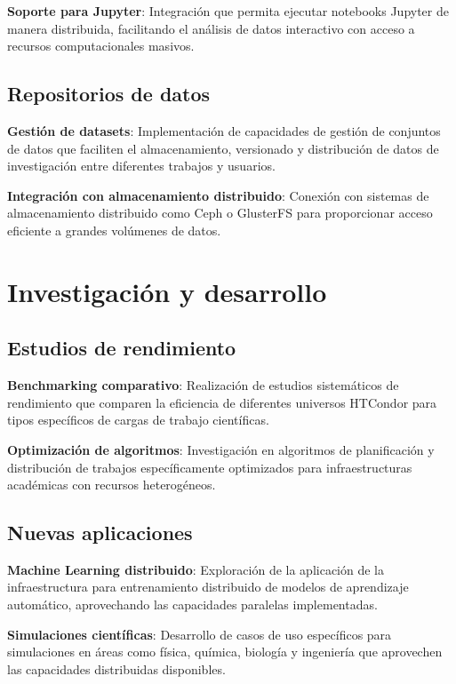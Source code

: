 \textbf{Soporte para Jupyter}: Integración que permita ejecutar notebooks Jupyter de manera distribuida, facilitando el análisis de datos interactivo con acceso a recursos computacionales masivos.

\subsection{Repositorios de datos}
\noindent

\textbf{Gestión de datasets}: Implementación de capacidades de gestión de conjuntos de datos que faciliten el almacenamiento, versionado y distribución de datos de investigación entre diferentes trabajos y usuarios.

\textbf{Integración con almacenamiento distribuido}: Conexión con sistemas de almacenamiento distribuido como Ceph o GlusterFS para proporcionar acceso eficiente a grandes volúmenes de datos.

\section{Investigación y desarrollo}
\noindent

\subsection{Estudios de rendimiento}
\noindent

\textbf{Benchmarking comparativo}: Realización de estudios sistemáticos de rendimiento que comparen la eficiencia de diferentes universos HTCondor para tipos específicos de cargas de trabajo científicas.

\textbf{Optimización de algoritmos}: Investigación en algoritmos de planificación y distribución de trabajos específicamente optimizados para infraestructuras académicas con recursos heterogéneos.

\subsection{Nuevas aplicaciones}
\noindent

\textbf{Machine Learning distribuido}: Exploración de la aplicación de la infraestructura para entrenamiento distribuido de modelos de aprendizaje automático, aprovechando las capacidades paralelas implementadas.

\textbf{Simulaciones científicas}: Desarrollo de casos de uso específicos para simulaciones en áreas como física, química, biología y ingeniería que aprovechen las capacidades distribuidas disponibles.

